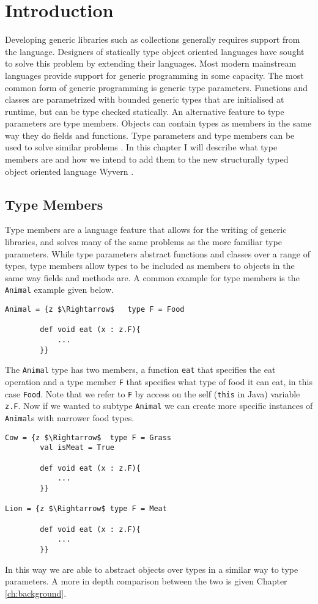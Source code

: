 \documentclass[11pt
              , a4paper
              , twoside
              , openright
              ]{report}
\numberwithin{case}{theorem}
\numberwithin{subcase}{case}
\begin{document}
\chapter{Introduction}\label{ch:intro}

Developing generic libraries such as collections generally requires support from the language. Designers of statically type object oriented languages have sought to solve this problem by extending their languages. Most modern mainstream languages provide support for generic programming in some capacity. The most common form of generic programming is generic type parameters. Functions and classes are parametrized with bounded generic types that are initialised at runtime, but can be type checked statically. An alternative feature to type parameters are type members. Objects can contain types as members in the same way they do fields and functions. Type parameters and type members can be used to solve similar problems \cite{Igarashi1999}. In this chapter I will describe what type members are and how we intend to add them to the new structurally typed object oriented language Wyvern  \cite{Nistor:2013:WST:2489828.2489830}.

\section{Type Members}
Type members are a language feature that allows for the writing of generic libraries, and solves many of the same problems as the more familiar type parameters. While type parameters abstract functions and classes over a range of types, type members allow types to be included as members to objects in the same way fields and methods are. A common example for type members is the \verb|Animal| example \cite{Igarashi1999, Amin:2014:FPT:2660193.2660216} given below.
\begin{lstlisting}[mathescape, style=custom_lang]
Animal = {z $\Rightarrow$	type F = Food
		
		def void eat (x : z.F){
			...
		}}
\end{lstlisting}
The \verb|Animal| type has two members, a function \verb|eat| that specifies the eat operation and a type member \verb|F| that specifies what type of food it can eat, in this case \verb|Food|.  Note that we refer to \verb|F| by access on the self (\verb|this| in Java) variable \verb|z.F|. Now if we wanted to subtype \verb|Animal| we can create more specific instances of \verb|Animal|s with narrower food types.
\begin{lstlisting}[mathescape, style=custom_lang]
Cow = {z $\Rightarrow$	type F = Grass
		val isMeat = True
		
		def void eat (x : z.F){
			...
		}}

Lion = {z $\Rightarrow$	type F = Meat
		
		def void eat (x : z.F){
			...
		}}
\end{lstlisting}
In this way we are able to abstract objects over types in a similar way to type parameters. A more in depth comparison between the two is given Chapter \ref{ch:background}.
\end{document}
